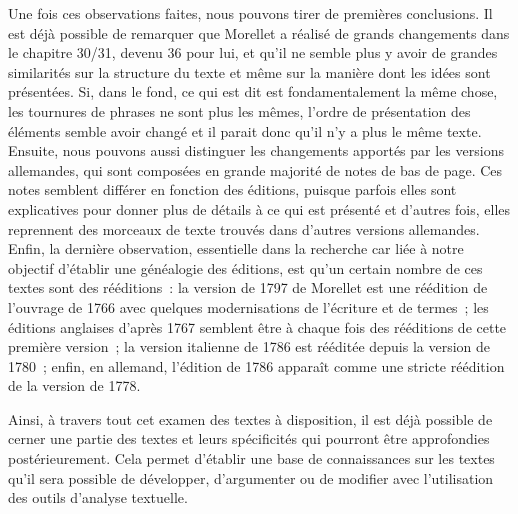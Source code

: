 Une fois ces observations faites, nous pouvons tirer de premières conclusions. Il est déjà possible de remarquer que Morellet a réalisé de grands changements dans le chapitre 30/31, devenu 36 pour lui, et qu'il ne semble plus y avoir de grandes similarités sur la structure du texte et même sur la manière dont les idées sont présentées. Si, dans le fond, ce qui est dit est fondamentalement la même chose, les tournures de phrases ne sont plus les mêmes, l'ordre de présentation des éléments semble avoir changé et il parait donc qu'il n'y a plus le même texte. Ensuite, nous pouvons aussi distinguer les changements apportés par les versions allemandes, qui sont composées en grande majorité de notes de bas de page. Ces notes semblent différer en fonction des éditions, puisque parfois elles sont explicatives pour donner plus de détails à ce qui est présenté et d'autres fois, elles reprennent des morceaux de texte trouvés dans d'autres versions allemandes. Enfin, la dernière observation, essentielle dans la recherche car liée à notre objectif d'établir une généalogie des éditions, est qu'un certain nombre de ces textes sont des rééditions~: la version de 1797 de Morellet est une réédition de l'ouvrage de 1766 avec quelques modernisations de l'écriture et de termes~; les éditions anglaises d'après 1767 semblent être à chaque fois des rééditions de cette première version~; la version italienne de 1786 est rééditée depuis la version de 1780~; enfin, en allemand, l'édition de 1786 apparaît comme une stricte réédition de la version de 1778. \pagebreak

Ainsi, à travers tout cet examen des textes à disposition, il est déjà possible de cerner une partie des textes et leurs spécificités qui pourront être approfondies postérieurement. Cela permet d'établir une base de connaissances sur les textes qu'il sera possible de développer, d'argumenter ou de modifier avec l'utilisation des outils d'analyse textuelle.

